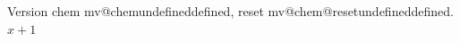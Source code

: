 \documentclass{article}
\makeatletter
\edef\x{\expandafter\ifx\csname mv@chem\endcsname\relax undefined\else defined\fi}
\edef\y{\expandafter\ifx\csname mv@chem@reset\endcsname\relax undefined\else defined\fi}
\makeatother
\begin{document}
Version chem \x, reset \y. {$x+1$}
\end{document}
